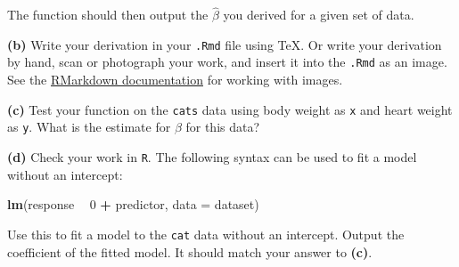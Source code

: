 \documentclass[]{article}
\newenvironment{Shaded}{\begin{snugshade}}{\end{snugshade}}
\newcommand{\KeywordTok}[1]{\textcolor[rgb]{0.13,0.29,0.53}{\textbf{#1}}}
\newcommand{\DataTypeTok}[1]{\textcolor[rgb]{0.13,0.29,0.53}{#1}}
\newcommand{\DecValTok}[1]{\textcolor[rgb]{0.00,0.00,0.81}{#1}}
\newcommand{\StringTok}[1]{\textcolor[rgb]{0.31,0.60,0.02}{#1}}
\newcommand{\OperatorTok}[1]{\textcolor[rgb]{0.81,0.36,0.00}{\textbf{#1}}}
\newcommand{\NormalTok}[1]{#1}
\begin{document}
The function should then output the \(\hat{\beta}\) you derived for a
given set of data.

\textbf{(b)} Write your derivation in your \texttt{.Rmd} file using TeX.
Or write your derivation by hand, scan or photograph your work, and
insert it into the \texttt{.Rmd} as an image. See the
\href{http://rmarkdown.rstudio.com/}{RMarkdown documentation} for
working with images.

\textbf{(c)} Test your function on the \texttt{cats} data using body
weight as \texttt{x} and heart weight as \texttt{y}. What is the
estimate for \(\beta\) for this data?

\textbf{(d)} Check your work in \texttt{R}. The following syntax can be
used to fit a model without an intercept:

\begin{Shaded}
\begin{Highlighting}[]
\KeywordTok{lm}\NormalTok{(response }\OperatorTok{~}\StringTok{ }\DecValTok{0} \OperatorTok{+}\StringTok{ }\NormalTok{predictor, }\DataTypeTok{data =}\NormalTok{ dataset)}
\end{Highlighting}
\end{Shaded}

Use this to fit a model to the \texttt{cat} data without an intercept.
Output the coefficient of the fitted model. It should match your answer
to \textbf{(c)}.
\end{document}
